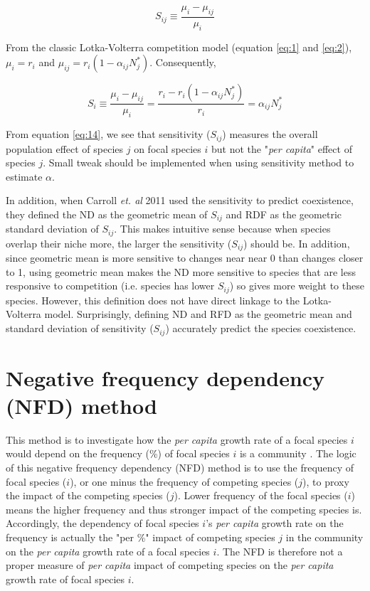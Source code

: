\documentclass[fleqn]{article}
\begin{document}
\begin{equation}\label{eq:13}
S_{ij} \equiv \frac{\mu_{i}-\mu_{ij}}{\mu_{i}}
\end{equation}

From the classic Lotka-Volterra competition model (equation \ref{eq:1} and \ref{eq:2}), $\mu_{i} = r_i$ and $\mu_{ij} = r_i(1-\alpha_{ij}N^*_j)$. Consequently, 

\begin{equation}\label{eq:14}
S_i \equiv \frac{\mu_{i}-\mu_{ij}}{\mu_{i}} = \frac{r_i-r_i(1-\alpha_{ij}N^*_j)}{r_i} = \alpha_{ij}N^*_j
\end{equation}

From equation \ref{eq:14}, we see that sensitivity ($S_{ij}$) measures the overall population effect of species ${j}$ on focal species $i$ but not the "\textit{per capita}" effect of species $j$. Small tweak should be implemented when using sensitivity method to estimate $\alpha$. 

In addition, when Carroll \textit{et. al} 2011 used the sensitivity to predict coexistence, they defined the ND as the geometric mean of $S_{ij}$ and RDF as the geometric standard deviation of $S_{ij}$. This makes intuitive sense because when species overlap their niche more, the larger the sensitivity ($S_{ij}$) should be. In addition, since geometric mean is more sensitive to changes near near 0 than changes closer to 1, using geometric mean makes the ND more sensitive to species that are less responsive to competition (i.e. species has lower $S_{ij}$) so gives more weight to these species. However, this definition does not have direct linkage to the Lotka-Volterra model. Surprisingly, defining ND and RFD as the geometric mean and standard deviation of sensitivity ($S_{ij}$) accurately predict the species coexistence.  

\newpage
\section{Negative frequency dependency (NFD) method}

This method is to investigate how the \textit{per capita} growth rate of a focal species $i$ would depend on the frequency (\%) of focal species $i$ is a community \cite{Adler2007, Levine2009, Hillerislambers2012, Godoy2014}. The logic of this negative frequency dependency (NFD) method is to use the frequency of focal species ($i$), or one minus the frequency of competing species ($j$), to proxy the impact of the competing species ($j$). Lower frequency of the focal species ($i$) means the higher frequency and thus stronger impact of the competing species is. Accordingly, the dependency of focal species $i$'s \textit{per capita} growth rate on the frequency is actually the "per \%" impact of competing species $j$ in the community on the \textit{per capita} growth rate of a focal species $i$. The NFD is therefore not a proper measure of \textit{per capita} impact of competing species on the \textit{per capita} growth rate of focal species $i$. 
\end{document}
